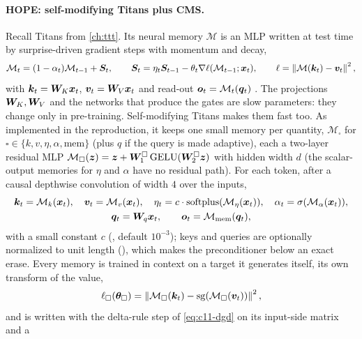 \paragraph{HOPE: self-modifying Titans plus CMS.} Recall Titans from \cref{ch:ttt}. Its neural
memory $\mathcal{M}$ is an MLP written at test time by surprise-driven gradient steps with
momentum and decay,
\begin{equation}
  \mathcal{M}_t = (1-\alpha_t)\mathcal{M}_{t-1} + \bm{S}_t, \qquad
  \bm{S}_t = \eta_t\bm{S}_{t-1} - \theta_t\nabla\ell(\mathcal{M}_{t-1};\bm{x}_t), \qquad
  \ell = \left\lVert \mathcal{M}(\bm{k}_t) - \bm{v}_t\right\rVert^2 ,
  \label{eq:c11-titans}
\end{equation}
with $\bm{k}_t = \bm{W}_K\bm{x}_t$, $\bm{v}_t = \bm{W}_V\bm{x}_t$ and read-out $\bm{o}_t = \mathcal{M}_t(\bm{q}_t)$
\citep{behrouz2025titans}. The projections $\bm{W}_K, \bm{W}_V$ and the networks that produce the gates
are slow parameters: they change only in pre-training. Self-modifying Titans makes them fast too.
As implemented in the reproduction, it keeps one small memory per quantity,
$\mathcal{M}_\square$ for $\square \in \{k, v, \eta, \alpha, \text{mem}\}$ (plus $q$ if the query is
made adaptive), each a two-layer residual MLP
$\mathcal{M}_\square(\bm{z}) = \bm{z} + \bm{W}^\square_1\,\mathrm{GELU}(\bm{W}^\square_2\bm{z})$ with hidden
width $d$ (the scalar-output memories for $\eta$ and $\alpha$ have no residual path). For each
token, after a causal depthwise convolution of width $4$ over the inputs,
\begin{equation}
\begin{gathered}
  \bm{k}_t = \mathcal{M}_k(\bm{x}_t),\quad
  \bm{v}_t = \mathcal{M}_v(\bm{x}_t),\quad
  \eta_t = c\cdot\mathrm{softplus}(\mathcal{M}_\eta(\bm{x}_t)),\quad
  \alpha_t = \sigma(\mathcal{M}_\alpha(\bm{x}_t)),\\
  \bm{q}_t = \bm{W}_q\bm{x}_t,\qquad
  \bm{o}_t = \mathcal{M}_{\text{mem}}(\bm{q}_t),
\end{gathered}
  \label{eq:c11-selfmod-read}
\end{equation}
with a small constant $c$ (, default $10^{-3}$); keys and queries are optionally
normalized to unit length (), which makes the preconditioner below an exact erase. Every memory is trained in
context on a target it generates itself, its own transform of the value,
\begin{equation}
  \ell_\square(\bm{\theta}_\square) = \left\lVert \mathcal{M}_\square(\bm{k}_t) - \operatorname{sg}(\mathcal{M}_\square(\bm{v}_t))\right\rVert^2 ,
  \label{eq:c11-selfmod-loss}
\end{equation}
and is written with the delta-rule step of \cref{eq:c11-dgd} on its input-side matrix and a
